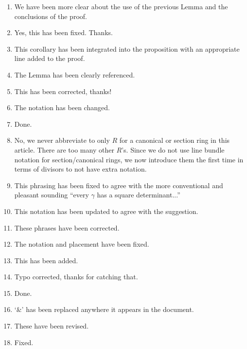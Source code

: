 \documentclass[12pt]{article}
\begin{document}
\begin{enumerate}
		\item We have been more clear about the use of the previous Lemma and the conclusions of the proof.
		
		\item Yes, this has been fixed. Thanks.
		
		\item This corollary has been integrated into the proposition with an appropriate line added to the proof.
		
		\item The Lemma has been clearly referenced.
		
		\item This has been corrected, thanks!
		
		\item The notation has been changed.
		
		\item Done.
		
		\item No, we never abbreviate to only $R$ for a canonical or section ring in this article. There are too many other $R$'s. Since we do not use line bundle notation for section/canonical rings, we now introduce them the first time in terms of divisors to not have extra notation. 
		
		\item This phrasing has been fixed to agree with the more conventional and pleasant sounding ``every $\gamma$ has  a square determinant...''
		
		\item This notation has been updated to agree with the suggestion.
		
		\item These phrases have been corrected. 
		
		\item The notation and placement have been fixed.
		
		\item This has been added.
		
		\item Typo corrected, thanks for catching that.
		
		\item Done. 
		
		\item `$\&$' has been replaced anywhere it appears in the document.
		
		\item These have been revised.
		
		\item Fixed.
		

\end{enumerate}
\end{document}
